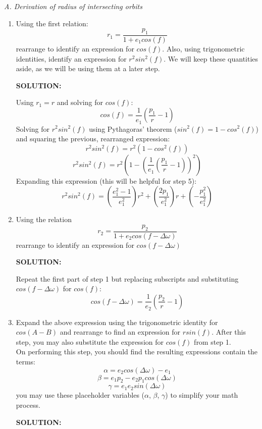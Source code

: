 \documentclass[12pt, letterpaper]{aiaa-tc}
\begin{document}
\raggedright \textit{A. Derivation of radius of intersecting orbits}
\begin{enumerate}
    
    \item Using the first relation:
    \[ r_1=\frac{p_1}{1+e_1 cos(f)} \]
    rearrange to identify an expression for $cos(f)$. Also, using trigonometric identities, identify an expression for
    $r^{2}sin^{2}(f)$. We will keep these quantities aside, as we will be using them at a later step.
    
    \textbf{SOLUTION:}
    
    Using $r_1=r$ and solving for $cos(f)$:
    \[ cos(f)=\frac{1}{e_1}\left (\frac{p_1}{r}-1 \right) \]
    Solving for $r^2sin^2(f)$ using Pythagoras' theorem ($sin^2(f)=1-cos^2(f)$) and squaring the previous, rearranged expression:
    \[ r^2sin^2(f) = r^2(1-cos^2(f)) \]
    \[ r^2sin^2(f) = r^2\left (1- \left(\frac{1}{e_1}\left (\frac{p_1}{r}-1 \right)\right)^2 \right) \]
    Expanding this expression (this will be helpful for step 5):
    \[ r^2sin^2(f) = \left(\frac{e_1^2-1}{e_1^2}\right)r^2+\left(\frac{2p_1}{e_1^2}\right)r+\left(-\frac{p_1^2}{e_1^2}\right) \]
    \item Using the relation
    \[ r_2=\frac{p_2}{1+e_2 cos(f-\Delta\omega)} \]
    rearrange to identify an expression for $cos(f-\Delta\omega)$

    \textbf{SOLUTION:}

    Repeat the first part of step 1 but replacing subscripts and substituting $cos(f-\Delta\omega)$ for $cos(f)$:
    \[ cos(f-\Delta\omega)=\frac{1}{e_2}\left (\frac{p_2}{r}-1 \right) \]
    
    \item Expand the above expression using the trigonometric identity for $cos(A-B)$
    and rearrange to find an expression for $rsin(f)$. After this step, you may also substitute the expression for 
    $cos(f)$ from step 1.
    \\On performing this step, you should find the resulting expressions contain the terms:
    \[ \alpha=e_2cos(\Delta\omega)-e_1 \]
    \[ \beta=e_1p_2-e_2p_1cos(\Delta\omega) \]
    \[ \gamma=e_1e_2sin(\Delta\omega) \]
    you may use these placeholder variables ($\alpha$, $\beta$, $\gamma$) to simplify your math process.

    \textbf{SOLUTION:}


\end{enumerate}
\end{document}
